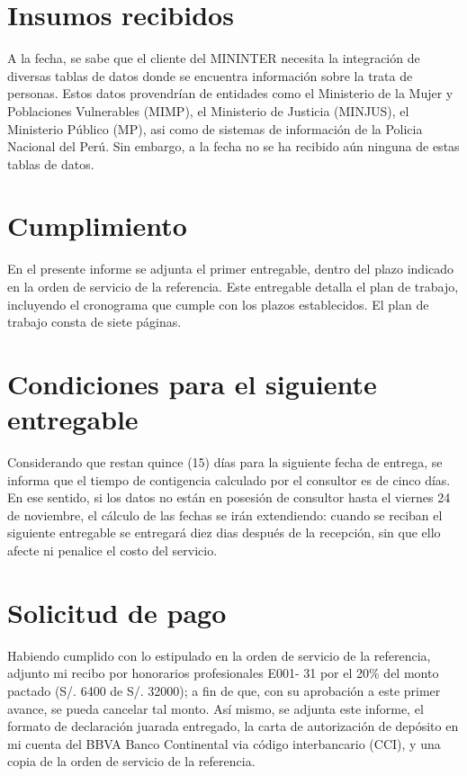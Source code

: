 \documentclass[a4paper,12pt]{texMemo} %
\begin{document}
\section{Insumos recibidos}

A la fecha, se sabe que el cliente del MININTER necesita la integración de diversas tablas de datos donde se encuentra información sobre la trata de personas. Estos datos provendrían de entidades como el Ministerio de la Mujer y Poblaciones Vulnerables (MIMP), el Ministerio de Justicia (MINJUS), el Ministerio Público (MP), asi como de sistemas de información de la Policia Nacional del Perú. Sin embargo, a la fecha no se ha recibido aún ninguna de estas tablas de datos.

\section{Cumplimiento}

En el presente informe se adjunta el primer entregable, dentro del plazo indicado en la orden de servicio de la referencia. Este entregable detalla el plan de trabajo, incluyendo el cronograma que cumple con los plazos establecidos. El plan de trabajo consta de siete páginas.

\section{Condiciones para el siguiente entregable}

Considerando que restan quince (15) días para la siguiente fecha de entrega, se informa que el tiempo de contigencia calculado por el consultor es de cinco días. En ese sentido, si los datos no están en posesión de consultor hasta el viernes 24 de noviembre, el cálculo de las fechas se irán extendiendo: cuando se reciban el siguiente entregable se entregará diez dias después de la recepción, sin que ello afecte ni penalice el costo del servicio.

\section{Solicitud de pago}

Habiendo cumplido con lo estipulado en la orden de servicio de la referencia, adjunto mi recibo por honorarios profesionales \textnumero E001- 31 por el 20\% del monto pactado (S/. 6400 de S/. 32000); a fin de que, con su aprobación a este primer avance, se pueda cancelar tal monto. Así mismo, se adjunta  este informe, el formato de declaración juarada entregado,  la carta de autorización de depósito en mi cuenta del BBVA Banco Continental via código interbancario (CCI), y una copia de la orden de servicio de la referencia.
\end{document}
